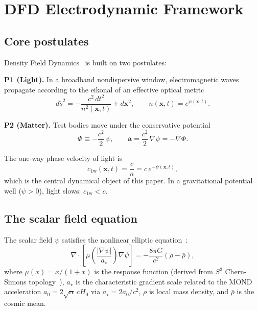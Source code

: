 \documentclass[aps,prd,twocolumn,superscriptaddress,nofootinbib,floatfix]{revtex4-2}
\newcommand{\psifield}{\psi}
\newcommand{\cfield}{c_{\text{1w}}}
\newcommand{\cvac}{c}
\newcommand{\avec}{\mathbf{a}}
\newcommand{\xvec}{\mathbf{x}}
\begin{document}
\section{DFD Electrodynamic Framework}
\label{sec:framework}

\subsection{Core postulates}

Density Field Dynamics~\cite{Alcock2025DFD} is built on two postulates:

\textbf{P1 (Light).} In a broadband nondispersive window,
electromagnetic waves propagate according to the eikonal of an
effective optical metric
\begin{equation}
d\tilde{s}^2 = -\frac{\cvac^2\,dt^2}{n^2(\xvec,t)} + d\xvec^2,
\qquad n(\xvec,t) = e^{\psifield(\xvec,t)}.
\label{eq:optical_metric}
\end{equation}

\textbf{P2 (Matter).} Test bodies move under the conservative
potential
\begin{equation}
\Phi \equiv -\frac{\cvac^2}{2}\,\psifield, \qquad
\avec = \frac{\cvac^2}{2}\,\nabla\psifield = -\nabla\Phi.
\label{eq:matter_potential}
\end{equation}

The one-way phase velocity of light is
\begin{equation}
\cfield(\xvec,t) = \frac{\cvac}{n} = \cvac\,e^{-\psifield(\xvec,t)},
\label{eq:c_field}
\end{equation}
which is the central dynamical object of this paper. In a
gravitational potential well ($\psifield > 0$), light slows:
$\cfield < \cvac$.

\subsection{The scalar field equation}

The scalar field $\psifield$ satisfies the nonlinear elliptic
equation~\cite{Alcock2025DFD}:
\begin{equation}
\nabla\cdot\!\left[\mu\!\left(\frac{|\nabla\psifield|}{a_\star}\right)
\nabla\psifield\right] = -\frac{8\pi G}{\cvac^2}(\rho - \bar\rho),
\label{eq:field_equation}
\end{equation}
where $\mu(x) = x/(1+x)$ is the response function (derived from
$S^3$ Chern-Simons topology~\cite{Alcock2025DFD}), $a_\star$ is
the characteristic gradient scale related to the MOND acceleration
$a_0 = 2\sqrt{\alpha}\,\cvac H_0$ via $a_\star = 2a_0/\cvac^2$,
$\rho$ is local mass density, and $\bar\rho$ is the cosmic mean.
\end{document}
